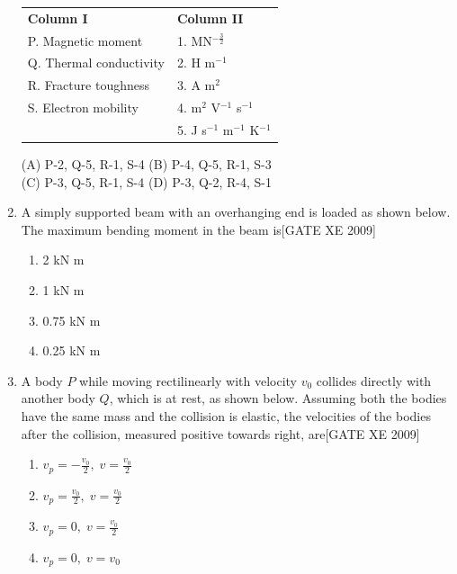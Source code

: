 \documentclass[journal,12pt,onecolumn]{IEEEtran}
\theoremstyle{remark}
\begin{document}
\begin{enumerate}
\begin{tabular}{p{6cm} p{6cm}}
\textbf{Column I} & \textbf{Column II} \\
P. Magnetic moment & 1. MN$^{-\tfrac{3}{2}}$ \\
Q. Thermal conductivity & 2. H m$^{-1}$ \\
R. Fracture toughness & 3. A m$^2$ \\
S. Electron mobility & 4. m$^2$ V$^{-1}$ s$^{-1}$ \\
& 5. J s$^{-1}$ m$^{-1}$ K$^{-1}$ \\
\end{tabular}



\noindent
(A) P-2, Q-5, R-1, S-4 \hfill
(B) P-4, Q-5, R-1, S-3 \\
(C) P-3, Q-5, R-1, S-4 \hfill
(D) P-3, Q-2, R-4, S-1



\item A simply supported beam with an overhanging end is loaded as shown below. The maximum bending moment in the beam is\hfill[GATE XE 2009]

\begin{multicols}{2}
\begin{enumerate}
    \item 2 kN m
    \item 1 kN m
    \item 0.75 kN m
    \item 0.25 kN m
\end{enumerate}
\end{multicols}



\item A body $ P $ while moving rectilinearly with velocity $ v_0 $ collides directly with another body $ Q $, which is at rest, as shown below. Assuming both the bodies have the same mass and the collision is elastic, the velocities of the bodies after the collision, measured positive towards right, are\hfill[GATE XE 2009]

\begin{multicols}{2}
\begin{enumerate}
    \item $v_p = -\frac{v_0}{2},\; v = \frac{v_0}{2}$
    \item $v_p = \frac{v_0}{2},\; v = \frac{v_0}{2}$
    \item $v_p = 0,\; v = \frac{v_0}{2}$
    \item $v_p = 0,\; v = v_0$
\end{enumerate}
\end{multicols}




\end{enumerate}
\end{document}
